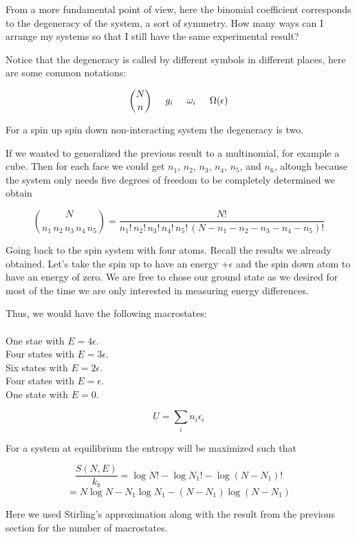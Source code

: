 \documentclass[10pt,twoside,openright]{memoir}
\begin{document}
From a more fundamental point of view, here the binomial coefficient corresponds to the degeneracy of the system, a sort of symmetry. How many ways can I arrange my systems so that I still have the same experimental result?

Notice that the degeneracy is called by different symbols in different places, here are some common notations:

$$
{N \choose n} \hspace{5 mm} g_i \hspace{5 mm} \omega_i \hspace{5 mm} \Omega( \epsilon )
$$

For a spin up spin down non-interacting system the degeneracy is two.

If we wanted to generalized the previous result to a multinomial, for example a cube. Then for each face we could get $n_1$, $n_2$, $n_3$, $n_4$, $n_5$, and $n_6$, altough because the system only needs five degrees of freedom to be completely determined we obtain

$$
{N \choose n_1 \, n_2 \,n_3 \, n_4 \, n_5 }= \frac{N!}{n_1! \, n_2! \,n_3! \, n_4! \, n_5! \, \left( N- n_1 -n_2 -n_3 -n_4 -n_5 \right)!}
$$

Going back to the spin system with four atoms. Recall the results we already obtained. Let's take the spin up to have an energy $+ \epsilon $ and the spin down atom to have an energy of zero. We are free to chose our ground state as we desired for most of the time we are only interested in measuring energy differences.

Thus, we would have the following macrostates: \\~\\
One stae with $E= 4 \epsilon$.\\
Four states with $E = 3 \epsilon$. \\
Six states with $E = 2 \epsilon$. \\
Four states with $E = \epsilon $.\\
One state with $E=0$.





$$ U = \sum_i n_i \epsilon_i $$

For a system at equilibrium the entropy will be maximized such that

$$
\frac{S(N,E)}{k_b} = \log N! - \log N_1 ! - \log (N-N_1)!
$$$$
= N \log N - N_1 \log N_1 - \left( N-N_1 \right) \log (N-N_1)
$$

Here we used Stirling's approximation along with the result from the previous section for the number of macrostates. 
\end{document}
